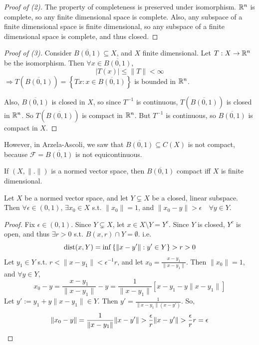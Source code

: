 \begin{proof}[Proof of (2)]
    The property of completeness is preserved under isomorphism. 
    $\mathbb{R}^n$ is complete, so any finite dimensional space is complete. 
    Also, any subspace of a finite dimensional space is finite dimensional, 
    so any subspace of a finite dimensional space is complete, and thus closed. 
\end{proof}

\begin{proof}[Proof of (3)]
    Consider $\overline{B(0, 1)} \subseteq X$, and $X$ finite dimensional. Let $T : X \to \mathbb{R}^n$
    be the isomorphism. Then $\forall x \in \overline{B(0, 1)}$,
    \[
        |T(x)| \leq \| T \| < \infty
    \]  
    $\Rightarrow T(\overline{B(0, 1)}) = \left\{ Tx : x \in \overline{B(0, 1)} \right\} $
    is bounded in $\mathbb{R}^n$.
    
    Also, $\overline{B(0, 1)}$ is closed in $X$, so since $T^{-1}$ is continuous, 
    $T(\overline{B(0, 1)})$ is closed in $\mathbb{R}^n$. So $T(\overline{B(0, 1)})$ is compact in $\mathbb{R}^n$.
    But $T^{-1}$ is continuous, so $\overline{B(0, 1)}$ is compact in $X$.         
\end{proof}
\begin{rem}
    However, in Arzela-Ascoli, we saw that $\overline{B(0, 1)} \subseteq C(X)$ is not compact,
    because $\mathcal{F} = \overline{B(0, 1)}$ is not equicontinuous.  
\end{rem}

\begin{thm} 
    If $(X, \| . \| )$ is a normed vector space, then $\overline{B(0, 1)}$ compact iff $X$ is
    finite dimensional.   
\end{thm}

\begin{lem}
    Let $X$ be a normed vector space, and let $Y \subsetneq X$ be a closed, linear subspace. 
    Then $\forall \epsilon \in (0, 1)$, $\exists x_0 \in X$ s.t. $\| x_0 \| = 1$, 
    and $\| x_0 - y \| > \epsilon \quad \forall y \in Y$.
\end{lem}

\begin{proof}
    Fix $\epsilon \in (0, 1)$. Since $Y \subsetneq X$, let $x \in X \setminus Y = Y^c$. Since
    $Y$ is closed, $Y^c$ is open, and thus $\exists r > 0$ s.t. $B(x, r) \cap Y = \emptyset$.
    i.e.
    \[
        \operatorname{dist}(x, Y) = \inf \left\{ \| x - y' \| : y' \in Y  \right\} > r > 0 
    \]      
    Let $y_1 \in Y$ s.t. $r < \| x - y_1 \| < \epsilon^{-1}r$, and let 
    $x_0 = \frac{x - y_1}{\| x - y_1 \| }$. Then $\| x_0 \| = 1$, and $\forall y \in Y$,  
    \[
        x_0 - y = \frac{x - y_1}{\| x - y_1 \| } - y = \frac{1}{\| x - y_1 \| } [x-y_1 - y \| x - y_1 \| ]
    \] 
    Let $y' := y_1 + y \| x - y_1 \| \in Y $. Then $y'  = \frac{1}{\| x - y_1 \| (x - y') }$.
    So, 
    \[
    \| x_0 - y \| = \frac{1}{\| x - y_1 \| } \| x - y' \|  > \frac{\epsilon}{r} \| x - y' \| > 
    \frac{\epsilon}{r} r  = \epsilon \qedhere
    \] 
\end{proof}

